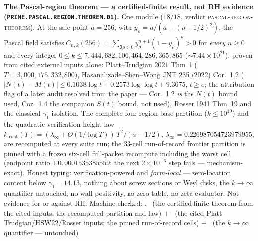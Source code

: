 \par\smallskip\noindent\textbf{The Pascal-region theorem --- a
certified-finite result, not RH evidence
(\texttt{PRIME.PASCAL.\allowbreak REGION.\allowbreak THEOREM.01}).}
One module ($18/18$, verdict \textsc{pascal-region-theorem}).  At
the safe point $a = 256$, with $y_\rho = a/(a - (\rho - 1/2)^2)$,
the Pascal field satisfies $C_{n,k}(256) = \sum_{\Im\rho > 0}
y_\rho^{n+1}(1 - y_\rho)^k > 0$ for \emph{every} $n \ge 0$ and
every integer $0 \le k \le
7{,}444{,}682{,}106{,}464{,}286{,}365{,}865$
($\sim 7.44\times10^{21}$), proven from cited external inputs
alone: Platt--Trudgian 2021 Thm~1
($T = 3{,}000{,}175{,}332{,}800$), Hasanalizade--Shen--Wong JNT
235 (2022) Cor.~1.2 ($|N(t) - M(t)| \le 0.1038\log t +
0.2573\log\log t + 9.3675$, $t \ge e$; the attribution flag of a
later audit resolved from the paper --- Cor.~1.2 \emph{is} the
$N(t)$ bound used, Cor.~1.4 the companion $S(t)$ bound, not
used), Rosser 1941 Thm~19 and the classical $\gamma_1$
isolation.  The complete four-region base partition
($k \le 10^{19}$) and the quadratic verification-height law
$k_{\mathrm{front}}(T) = (\lambda_\infty +
O(1/\log T))\,T^2/(a - 1/2)$, $\lambda_\infty =
0.226987054723979955$, are recomputed at every suite run; the
33-cell run-of-record frontier partition is pinned with a frozen
six-cell full-packet recompute including the worst cell
(endpoint ratio $1.000001535385559$; the next $2\times10^{-6}$
step fails --- mechanism-exact).  Honest typing:
verification-powered and \emph{form-local} --- zero-location
content below $\gamma_1 = 14.13$, nothing about screw sections
or Weyl disks, the $k \to \infty$ quantifier untouched; no wall
positivity, no zero table, no zeta evaluator.  Not evidence for
or against RH.
Machine-checked: .
\mE\ (the certified finite theorem from the cited inputs; the
recomputed partition and law) $+$ \mC\ (the cited
Platt--Trudgian/HSW22/Rosser inputs; the pinned run-of-record
cells) $+$ \mO\ (the $k \to \infty$ quantifier --- untouched)
\par\smallskip



